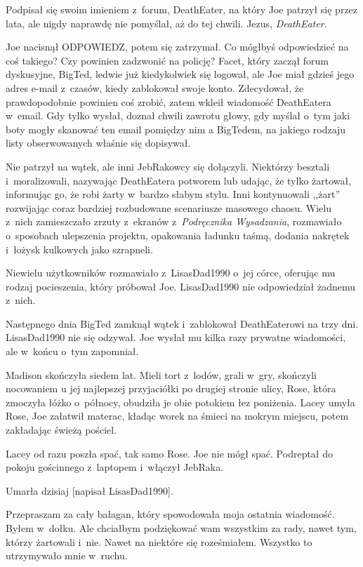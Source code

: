 \documentclass[oneside,polish,11pt,sfheadings]{mwbk}
\begin{document}
Podpisał się swoim imieniem z~forum, DeathEater, na który Joe patrzył
się przez lata, ale nigdy naprawdę nie pomyślał, aż do tej chwili.
Jezus, \textit{DeathEater}.

Joe nacisnął ODPOWIEDZ, potem się zatrzymał. Co mógłbyś odpowiedzieć na
coś takiego? Czy powinien zadzwonić na policję? Facet, który zaczął
forum dyskusyjne, BigTed, ledwie już kiedykolwiek się logował, ale Joe
miał gdzieś jego adres e-mail z~czasów, kiedy zablokował swoje konto.
Zdecydował, że prawdopodobnie powinien coś zrobić, zatem wkleił
wiadomość DeathEatera w~email. Gdy tylko wysłał, doznał chwili zawrotu
głowy, gdy myślał o~tym jaki boty mogły skanować ten email pomiędzy nim
a BigTedem, na jakiego rodzaju listy obserwowanych właśnie się
dopisywał.

Nie patrzył na wątek, ale inni JebRakowcy się dołączyli. Niektórzy
besztali i~moralizowali, nazywając DeathEatera potworem lub udając, że
tylko żartował, informując go, że robi żarty w~bardzo słabym stylu. Inni
kontynuowali ,,żart'' rozwijając coraz bardziej rozbudowane scenariusze
masowego chaosu. Wielu z~nich zamieszczało zrzuty z~ekranów z~\textit{Podręcznika Wysadzania}, rozmawiało o~sposobach ulepszenia
projektu, opakowania ładunku taśmą, dodania nakrętek i~łożysk kulkowych
jako szrapneli.

Niewielu użytkowników rozmawiało z~LisasDad1990 o~jej córce, oferując mu
rodzaj pocieszenia, który próbował Joe. LisasDad1990 nie odpowiedział
żadnemu z~nich.

Następnego dnia BigTed zamknął wątek i~zablokował DeathEaterowi na trzy
dni. LisasDad1990 nie się odzywał. Joe wysłał mu kilka razy prywatne
wiadomości, ale w~końcu o~tym zapomniał.

Madison skończyła siedem lat. Mieli tort z~lodów, grali w~gry, skończyli
nocowaniem u jej najlepszej przyjaciółki po drugiej stronie ulicy, Rose,
która zmoczyła łóżko o~północy, obudziła je obie potokiem łez poniżenia.
Lacey umyła Rose, Joe załatwił materac, kładąc worek na śmieci na mokrym
miejscu, potem zakładając świeżą pościel.

Lacey od razu poszła spać, tak samo Rose. Joe nie mógł spać. Podreptał
do pokoju gościnnego z~laptopem i~włączył JebRaka.

Umarła dzisiaj {[}napisał LisasDad1990{]}.

Przepraszam za cały bałagan, który spowodowała moja ostatnia wiadomość.
Byłem w~dołku. Ale chciałbym podziękować wam wszystkim za rady, nawet
tym, którzy żartowali i~nie. Nawet na niektóre się roześmiałem. Wszystko
to utrzymywało mnie w~ruchu.
\end{document}
